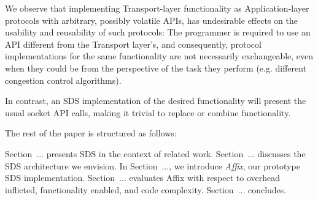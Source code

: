 We observe that implementing Transport-layer
functionality as Application-layer protocols with arbitrary, possibly
volatile \acp{API}, has undesirable effects on the usability and
reusability of such protocols: The programmer is required to use
an \ac{API} different from the Transport layer's, and consequently,
protocol implementations for the same functionality are not necessarily
exchangeable, even when they could be from the perspective of the
task they perform (e.g. different congestion control algorithms).

In contrast, an \ac{SDS} implementation of the desired functionality 
will present the usual socket \ac{API} calls, making it trivial to 
replace or combine functionality.




The rest of the paper is structured as follows:

Section~... presents \ac{SDS} in the context of related work.
Section~... discusses the \ac{SDS} architecture we envision.
In Section~..., we introduce \textit{Affix}, our prototype \ac{SDS} 
implementation.
Section~... evaluates Affix with respect to overhead inflicted, 
functionality enabled, and code complexity.
Section~... concludes.

